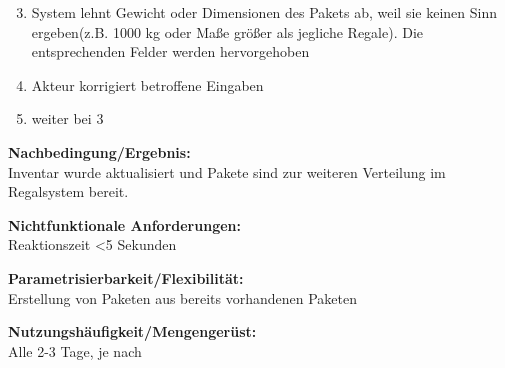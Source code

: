 \begin{enumerate}\setcounter{enumi}{2}
\item System lehnt Gewicht oder Dimensionen des Pakets ab, weil sie keinen Sinn ergeben(z.B. 1000 kg oder Maße größer als jegliche Regale). Die entsprechenden Felder werden hervorgehoben
\item Akteur korrigiert betroffene Eingaben
\item weiter bei 3
\end{enumerate}

\textbf{Nachbedingung/Ergebnis:}\\
Inventar wurde aktualisiert und Pakete sind zur weiteren Verteilung im Regalsystem bereit.

\textbf{Nichtfunktionale Anforderungen:\\
}Reaktionszeit \textless 5 Sekunden

\textbf{Parametrisierbarkeit/Flexibilität:}\\
Erstellung von Paketen aus bereits vorhandenen Paketen

\textbf{Nutzungshäufigkeit/Mengengerüst:}\\
Alle 2-3 Tage, je nach 